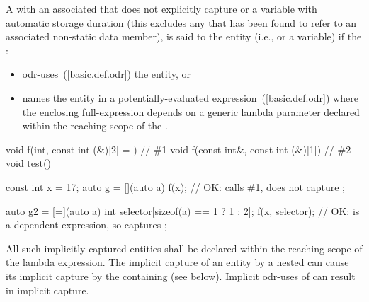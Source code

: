 \pnum
A  with an associated
 that does not explicitly capture  or
a variable with automatic storage duration (this excludes any 
that has been found to refer to an  associated
%
non-static data member), is said to  the entity (i.e.,
 or a variable) if the :
\begin{itemize}
\item odr-uses~(\ref{basic.def.odr}) the entity, or
\item names the entity in a potentially-evaluated
expression~(\ref{basic.def.odr}) where the enclosing full-expression depends on
a generic lambda parameter declared within the reaching scope of the
.
\end{itemize}
\enterexample
\begin{codeblock}
void f(int, const int (&)[2] = {})    { }   // \#1
void f(const int&, const int (&)[1])  { }   // \#2
void test() {
  const int x = 17;
  auto g = [](auto a) {
    f(x);  // OK: calls \#1, does not capture 
  };

  auto g2 = [=](auto a) {
    int selector[sizeof(a) == 1 ? 1 : 2]{};
    f(x, selector);  // OK: is a dependent expression, so captures 
  };
}
\end{codeblock}
\exitexample
All such implicitly captured
entities shall be declared within the reaching scope of the lambda expression.
\enternote The implicit capture of an entity by a nested
 can cause its implicit capture by the containing
 (see below). Implicit odr-uses of  can result
in implicit capture. \exitnote


